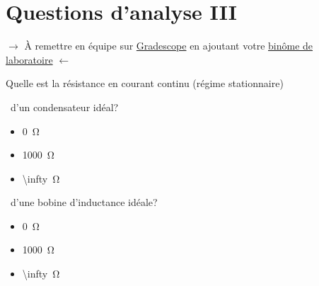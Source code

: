 \documentclass[canadien,12pt,oneside,letterpaper]{article}
\begin{document}
\section{Questions d'analyse III} \label{sec:grade}
\vspace{-0.5cm}
\noindent$\rightarrow$ À remettre en équipe sur \href{https://www.gradescope.com/}{Gradescope} en ajoutant votre \href{https://help.gradescope.com/article/m5qz2xsnjy-student-add-group-members}{binôme de laboratoire} $\leftarrow$
\vspace{-0.4cm}
\begin{gradescope}
    \item Quelle est la résistance en courant continu (régime stationnaire)
        \begin{gradescope}[topsep=-1pt]
        \item $\,$ d'un condensateur idéal?
            \begin{itemize}[label=$\blacktriangleright$,topsep=0pt,itemsep=-1ex]
            \item \qty{0}{\ohm}
            \item \qty{1000}{\ohm}
            \item \qty[parse-numbers = false]{\infty}{\ohm}
            \end{itemize}
        \item $\,$ d'une bobine d'inductance idéale?
            \begin{itemize}[label=$\blacktriangleright$, topsep=0pt,itemsep=-1ex]
            \item \qty{0}{\ohm}
            \item \qty{1000}{\ohm}
            \item \qty[parse-numbers = false]{\infty}{\ohm}
            \end{itemize}
        \end{gradescope}
\end{gradescope}
\vspace{-0.5ex}
\end{document}
